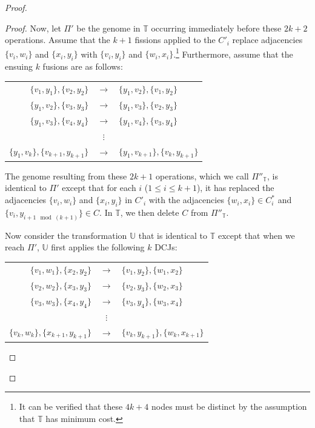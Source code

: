 \begin{proof}
\begin{proof}
Now, let $\Pi'$ be the genome in $\mathbb{T}$ occurring immediately before these $2k+2$ operations.  Assume that the $k+1$ fissions applied to the $C'_i$ replace adjacencies $\{v_i, w_i\}$ and $\{x_i, y_i\}$ with $\{v_i, y_i\}$ and $\{w_i, x_i\}$.\footnote{It can be verified that these $4k+4$ nodes must be distinct by the assumption that $\mathbb{T}$ has minimum cost.}  Furthermore, assume that the ensuing $k$ fusions are as follows:

\begin{center}
\begin{tabular}{r c l}
$\{v_1, y_1\}, \{v_2, y_2\}$ & $\rightarrow$ & $\{y_1, v_2\}, \{v_1, y_2\}$\\
$\{y_1, v_2\}, \{v_3, y_3\}$  & $\rightarrow$ & $\{y_1, v_3\}, \{v_2, y_3\}$\\
$\{y_1, v_3\}, \{v_4, y_4\}$ & $\rightarrow$ & $\{y_1, v_4\}, \{v_3, y_4\}$\\
& $\vdots$ & \\
$\{y_1, v_k\}, \{v_{k+1}, y_{k+1}\}$ & $\rightarrow$ & $\{y_1, v_{k+1}\}, \{v_k, y_{k+1}\}$
\end{tabular}
\end{center}

The genome resulting from these $2k+1$ operations, which we call $\Pi''_{\mathbb{T}}$, is identical to $\Pi'$ except that for each $i$ ($1 \leq i \leq k+1$), it has replaced the adjacencies $\{v_i, w_i\}$ and $\{x_i, y_i\}$ in $C'_i$ with the adjacencies $\{w_i, x_i\} \in C^{*}_i$ and $\{v_i, y_{i+1 \mod (k+1)}\} \in C$.  In  $\mathbb{T}$, we then delete $C$ from $\Pi''_{\mathbb{T}}$.

Now consider the transformation $\mathbb{U}$ that is identical to $\mathbb{T}$ except that when we reach $\Pi'$, $\mathbb{U}$ first applies the following $k$ DCJs:

\begin{center}
\begin{tabular}{r c l}
$\{v_1, w_1\}, \{x_2, y_2\}$ & $\rightarrow$ & $\{v_1, y_2\}, \{w_1, x_2\}$\\
$\{v_2, w_2\}, \{x_3, y_3\}$ & $\rightarrow$ & $\{v_2, y_3\}, \{w_2, x_3\}$\\
$\{v_3, w_3\}, \{x_4, y_4\}$ & $\rightarrow$ & $\{v_3, y_4\}, \{w_3, x_4\}$\\
& $\vdots$ & \\
$\{v_k, w_k\}, \{x_{k+1}, y_{k+1}\}$ & $\rightarrow$ & $\{v_k, y_{k+1}\}, \{w_k, x_{k+1}\}$
\end{tabular}
\end{center}


\end{proof}
\end{proof}
